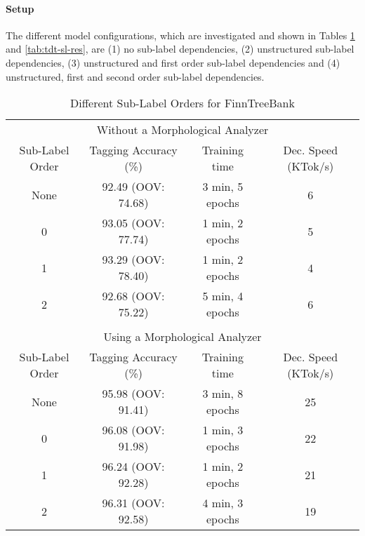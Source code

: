 \paragraph{Setup} The different model configurations, which are
investigated and shown in Tables \ref{tab:ftb-sl-res} and
\ref{tab:tdt-sl-res}, are (1) no sub-label dependencies, (2)
unstructured sub-label dependencies, (3) unstructured and first order
sub-label dependencies and (4) unstructured, first and second order
sub-label dependencies.

\begin{table}[htb!]
\begin{center}
\begin{tabular}{cccc}
\multicolumn{4}{c}{Without a Morphological Analyzer}\\
Sub-Label Order & Tagging Accuracy (\%) & Training time    & Dec. Speed (KTok/s)\\
\hline
None            & 92.49 (OOV: 74.68)    & 3 min, 5 epochs  & 6                       \\
0               & 93.05 (OOV: 77.74)    & 1 min, 2 epochs  & 5                       \\
1               & 93.29 (OOV: 78.40)    & 1 min, 2 epochs  & 4                       \\
2               & 92.68 (OOV: 75.22)    & 5 min, 4 epochs  & 6                       \\
                &                       &                  &                          \\
\multicolumn{4}{c}{Using a Morphological Analyzer}\\
Sub-Label Order & Tagging Accuracy (\%) & Training time    & Dec. Speed (KTok/s)\\
\hline
None     & 95.98 (OOV: 91.41)           & 3 min, 8 epochs  & 25                       \\
0        & 96.08 (OOV: 91.98)           & 1 min, 3 epochs  & 22                       \\
1        & 96.24 (OOV: 92.28)           & 1 min, 2 epochs  & 21                       \\
2        & 96.31 (OOV: 92.58)           & 4 min, 3 epochs  & 19                       \\
\end{tabular}
\caption{Different Sub-Label Orders for FinnTreeBank}\label{tab:ftb-sl-res}
\end{center}
\end{table}


